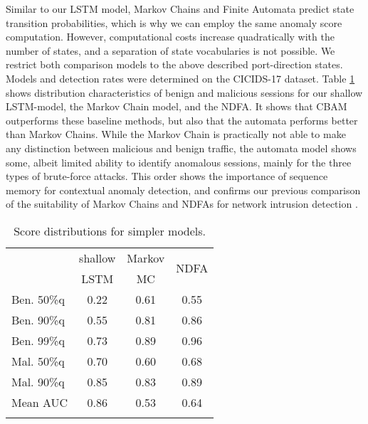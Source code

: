 Similar to our LSTM model, Markov Chains and Finite Automata predict state transition probabilities, which is why we can employ the same anomaly score computation. However, computational costs increase quadratically with the number of states, and a separation of state vocabularies is not possible. We restrict both comparison models to the above described port-direction states. 
Models and detection rates were determined on the CICIDS-17 dataset.
%
Table \ref{tab:Simpcomptab} shows distribution characteristics of benign and malicious sessions for our shallow LSTM-model, the Markov Chain model, and the NDFA. It shows that CBAM outperforms these baseline methods, but also that the automata performs better than Markov Chains. While the Markov Chain is practically not able to make any distinction between malicious and benign traffic, the automata model shows some, albeit limited ability to identify anomalous sessions, mainly for the three types of brute-force attacks. This order shows the importance of sequence memory for contextual anomaly detection, and confirms our previous comparison of the suitability of Markov Chains and NDFAs for network intrusion detection \cite{grov2019towards}.
\begin{table}[ht]
\centering
\begin{tabular}{l|ccc}
\hline
&shallow&Markov&\multirow{2}{*}{NDFA}\\
&LSTM&MC&\\
\hline
Ben. 50\%q&0.22&0.61&0.55\\[0.2cm]
Ben. 90\%q&0.55&0.81&0.86\\[0.2cm]
Ben. 99\%q&0.73&0.89&0.96\\[0.2cm]
Mal. 50\%q&0.70&0.60&0.68\\[0.2cm]
Mal. 90\%q&0.85&0.83&0.89\\[0.2cm]
Mean AUC&0.86&0.53&0.64\\ \hline
\multicolumn{2}{c}{ }
\end{tabular}
\caption{Score distributions for simpler models.}\label{tab:Simpcomptab}
\end{table}


